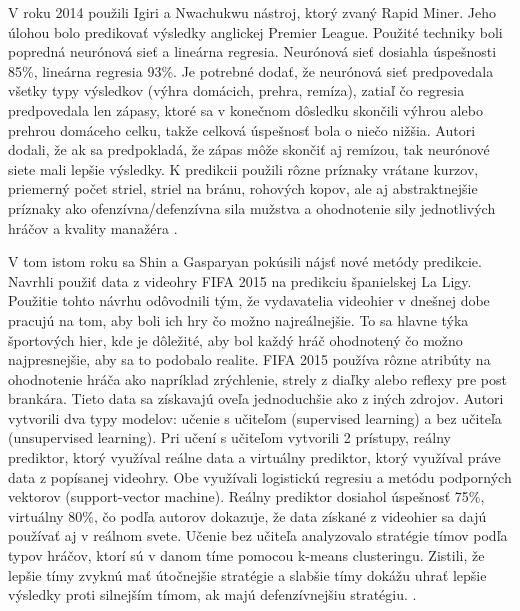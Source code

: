 V roku 2014 použili Igiri a Nwachukwu nástroj, ktorý zvaný Rapid Miner. 
Jeho úlohou bolo predikovať výsledky anglickej Premier League. 
Použité techniky boli popredná neurónová sieť a lineárna regresia. 
Neurónová sieť dosiahla úspešnosti 85\%, lineárna regresia 93\%. 
Je potrebné dodať, že neurónová sieť predpovedala všetky typy výsledkov (výhra domácich, prehra, remíza), zatiaľ čo regresia predpovedala len zápasy, ktoré sa v konečnom dôsledku skončili výhrou alebo prehrou domáceho celku, takže celková úspešnosť bola o niečo nižšia. 
Autori dodali, že ak sa predpokladá, že zápas môže skončiť aj remízou, tak neurónové siete mali lepšie výsledky. 
K predikcii použili rôzne príznaky vrátane kurzov, priemerný počet striel, striel na bránu, rohových kopov, ale aj abstraktnejšie príznaky ako ofenzívna/defenzívna sila mužstva a ohodnotenie sily jednotlivých hráčov a kvality manažéra \citep{related:igiri}.

V tom istom roku sa Shin a Gasparyan pokúsili nájsť nové metódy predikcie. 
Navrhli použiť data z videohry FIFA 2015 na predikciu španielskej La Ligy.
Použitie tohto návrhu odôvodnili tým, že vydavatelia videohier v dnešnej dobe pracujú na tom, aby boli ich hry čo možno najreálnejšie.
To sa hlavne týka športových hier, kde je dôležité, aby bol každý hráč ohodnotený čo možno najpresnejšie, aby sa to podobalo realite.
FIFA 2015 používa rôzne atribúty na ohodnotenie hráča ako napríklad zrýchlenie, strely z diaľky alebo reflexy pre post brankára.
Tieto data sa získavajú oveľa jednoduchšie ako z iných zdrojov.
Autori vytvorili dva typy modelov: učenie s učiteľom (supervised learning) a bez učiteľa (unsupervised learning).
Pri učení s učiteľom vytvorili 2 prístupy, reálny prediktor, ktorý využíval reálne data a virtuálny prediktor, ktorý využíval práve data z popísanej videohry.
Obe využívali logistickú regresiu a metódu podporných vektorov (support-vector machine).
Reálny prediktor dosiahol úspešnosť 75\%, virtuálny 80\%, čo podľa autorov dokazuje, že data získané z videohier sa dajú používať aj v reálnom svete.
Učenie bez učiteľa analyzovalo stratégie tímov podľa typov hráčov, ktorí sú v danom tíme pomocou k-means clusteringu. Zistili, že lepšie tímy zvyknú mať útočnejšie stratégie a slabšie tímy dokážu uhrať lepšie výsledky proti silnejším tímom, ak majú defenzívnejšiu stratégiu. \citep{related:shin}. \\
